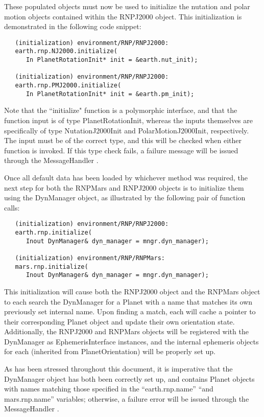 These populated objects must now be used to initialize the nutation and
polar motion objects contained within the RNPJ2000 object. This initialization
is demonstrated in the following code snippet:

\begin{verbatim}
   (initialization) environment/RNP/RNPJ2000:
   earth.rnp.NJ2000.initialize(
      In PlanetRotationInit* init = &earth.nut_init);

   (initialization) environment/RNP/RNPJ2000:
   earth.rnp.PMJ2000.initialize(
      In PlanetRotationInit* init = &earth.pm_init);
\end{verbatim}

Note that the ``initialize" function is a polymorphic interface, and that
the function input is of type PlanetRotationInit, whereas the inputs themselves
are specifically of type NutationJ2000Init and PolarMotionJ2000Init,
respectively. The input must be of the correct type, and this will be checked
when either function is invoked. If this type check fails, a failure
message will be issued through the MessageHandler \cite{dynenv:MESSAGE}.

Once all default data has been loaded by whichever method was required, the
next step for both the RNPMars and RNPJ2000 objects is to initialize them
using the DynManager object, as illustrated by the following pair of
function calls:

\begin{verbatim}
   (initialization) environment/RNP/RNPJ2000:
   earth.rnp.initialize(
      Inout DynManager& dyn_manager = mngr.dyn_manager);

   (initialization) environment/RNP/RNPMars:
   mars.rnp.initialize(
      Inout DynManager& dyn_manager = mngr.dyn_manager);
\end{verbatim}

This initialization will cause both the RNPJ2000 object and the RNPMars object
to each search the DynManager for a Planet with a name that matches its
own previously set internal name. Upon finding a match, each will
cache a pointer to their corresponding Planet object and update their own
orientation state. Additionally, the RNPJ2000 and RNPMars objects will be
registered with the DynManager as EphemerisInterface instances, and the
internal ephemeris objects for each (inherited from PlanetOrientation)
will be properly set up.

As has been stressed
throughout this document, it is imperative that the DynManager object has both
been correctly set up, and contains Planet objects with names matching those
specified in the ``earth.rnp.name'' ``and mars.rnp.name'' variables;
otherwise, a failure error will be issued through the MessageHandler
\cite{dynenv:MESSAGE}.

